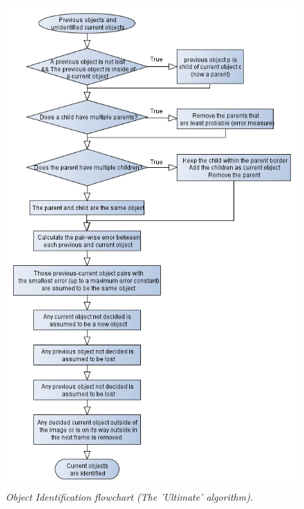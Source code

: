 \newpage
\begin{figure}[htb]
	\centering
	\includegraphics[width=116mm]{images/data_flow_identification.png}
	\caption{\textit{Object Identification flowchart (The 'Ultimate' algorithm).}}
	\label{fig:ObjID_fig} %
\end{figure}
